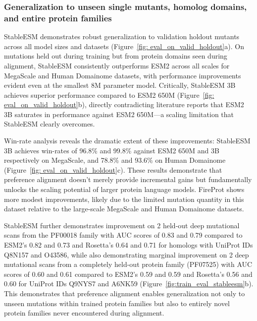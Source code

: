\documentclass[]{fairmeta}
\begin{document}
\subsubsection{Generalization to unseen single mutants, homolog domains, and entire protein families}
StableESM demonstrates robust generalization to validation holdout mutants across all model sizes and datasets (Figure~\ref{fig: eval_on_valid_holdout}a). On mutations held out during training but from protein domains seen during alignment, StableESM consistently outperforms ESM2 across all scales for MegaScale and Human Domainome datasets, with performance improvements evident even at the smallest 8M parameter model. Critically, StableESM 3B achieves superior performance compared to ESM2 650M (Figure~\ref{fig: eval_on_valid_holdout}b), directly contradicting literature reports that ESM2 3B saturates in performance against ESM2 650M—a scaling limitation that StableESM clearly overcomes.

Win-rate analysis reveals the dramatic extent of these improvements: StableESM 3B achieves win-rates of 96.8\% and 99.8\% against ESM2 650M and 3B respectively on MegaScale, and 78.8\% and 93.6\% on Human Domainome (Figure~\ref{fig: eval_on_valid_holdout}c). These results demonstrate that preference alignment doesn't merely provide incremental gains but fundamentally unlocks the scaling potential of larger protein language models. FireProt shows more modest improvements, likely due to the limited mutation quantity in this dataset relative to the large-scale MegaScale and Human Domainome datasets.

StableESM further demonstrates improvement on 2 held-out deep mutational scans from the PF00018 family with AUC scores of 0.83 and 0.79 compared to ESM2's 0.82 and 0.73 and Rosetta's 0.64 and 0.71 for homologs with UniProt IDs Q8N157 and O43586, while also demonstrating marginal improvement on 2 deep mutational scans from a completely held-out protein family (PF07525) with AUC scores of 0.60 and 0.61 compared to ESM2's 0.59 and 0.59 and Rosetta's 0.56 and 0.60 for UniProt IDs Q9NYS7 and A6NK59 (Figure~\ref{fig:train_eval_stableesm}b). This demonstrates that preference alignment enables generalization not only to unseen mutations within trained protein families but also to entirely novel protein families never encountered during alignment.
\end{document}
